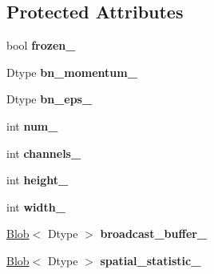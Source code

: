 \subsection*{Protected Attributes}
\begin{DoxyCompactItemize}
\item 
bool {\bfseries frozen\+\_\+}\hypertarget{classcaffe_1_1BNLayer_a398ea207e755b366ab0274ae4104d1fe}{}\label{classcaffe_1_1BNLayer_a398ea207e755b366ab0274ae4104d1fe}

\item 
Dtype {\bfseries bn\+\_\+momentum\+\_\+}\hypertarget{classcaffe_1_1BNLayer_a24b56f9f99fd1c5e6142cdc2ce9770c6}{}\label{classcaffe_1_1BNLayer_a24b56f9f99fd1c5e6142cdc2ce9770c6}

\item 
Dtype {\bfseries bn\+\_\+eps\+\_\+}\hypertarget{classcaffe_1_1BNLayer_aaae0341eafafe018fa7299281684dc89}{}\label{classcaffe_1_1BNLayer_aaae0341eafafe018fa7299281684dc89}

\item 
int {\bfseries num\+\_\+}\hypertarget{classcaffe_1_1BNLayer_a6e3ba8b86eb9ab95371598a734a37f91}{}\label{classcaffe_1_1BNLayer_a6e3ba8b86eb9ab95371598a734a37f91}

\item 
int {\bfseries channels\+\_\+}\hypertarget{classcaffe_1_1BNLayer_a486fafbd71b66558a4a39817a0f81810}{}\label{classcaffe_1_1BNLayer_a486fafbd71b66558a4a39817a0f81810}

\item 
int {\bfseries height\+\_\+}\hypertarget{classcaffe_1_1BNLayer_aac4cacb4c8476a9adbde3fa8e4d33068}{}\label{classcaffe_1_1BNLayer_aac4cacb4c8476a9adbde3fa8e4d33068}

\item 
int {\bfseries width\+\_\+}\hypertarget{classcaffe_1_1BNLayer_a1f9b9a0156f1005ee7c469c48422bc5a}{}\label{classcaffe_1_1BNLayer_a1f9b9a0156f1005ee7c469c48422bc5a}

\item 
\hyperlink{classcaffe_1_1Blob}{Blob}$<$ Dtype $>$ {\bfseries broadcast\+\_\+buffer\+\_\+}\hypertarget{classcaffe_1_1BNLayer_af78d467ce0aa574a61a3c27b0f3e1848}{}\label{classcaffe_1_1BNLayer_af78d467ce0aa574a61a3c27b0f3e1848}

\item 
\hyperlink{classcaffe_1_1Blob}{Blob}$<$ Dtype $>$ {\bfseries spatial\+\_\+statistic\+\_\+}\hypertarget{classcaffe_1_1BNLayer_a08748d7c7984137b8973a1dc424ecc92}{}\label{classcaffe_1_1BNLayer_a08748d7c7984137b8973a1dc424ecc92}


\end{DoxyCompactItemize}
